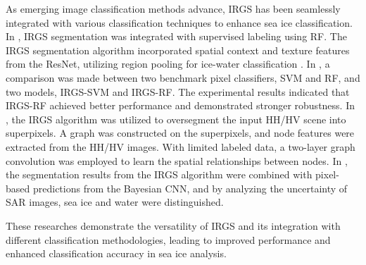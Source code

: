 As emerging image classification methods advance, IRGS has been seamlessly integrated with various classification techniques to enhance sea ice classification. In \cite{23hoekstra2020lake}, IRGS segmentation was integrated with supervised labeling using RF. The IRGS segmentation algorithm incorporated spatial context and texture features from the ResNet, utilizing region pooling for ice-water classification \cite{26jiang2022sea} . In \cite{28jiang2022sea}, a comparison was made between two benchmark pixel classifiers, SVM and RF, and two models, IRGS-SVM and IRGS-RF. The experimental results indicated that IRGS-RF achieved better performance and demonstrated stronger robustness. In \cite{27jiang2022semi}, the IRGS algorithm was utilized to oversegment the input HH/HV scene into superpixels. A graph was constructed on the superpixels, and node features were extracted from the HH/HV images. With limited labeled data, a two-layer graph convolution was employed to learn the spatial relationships between nodes. In \cite{29chen2023uncertainty},  the segmentation results from the IRGS algorithm were combined with pixel-based predictions from the Bayesian CNN, and by analyzing the uncertainty of SAR images, sea ice and water were distinguished.

These researches demonstrate the versatility of IRGS and its integration with different classification methodologies, leading to improved performance and enhanced classification accuracy in sea ice analysis.


